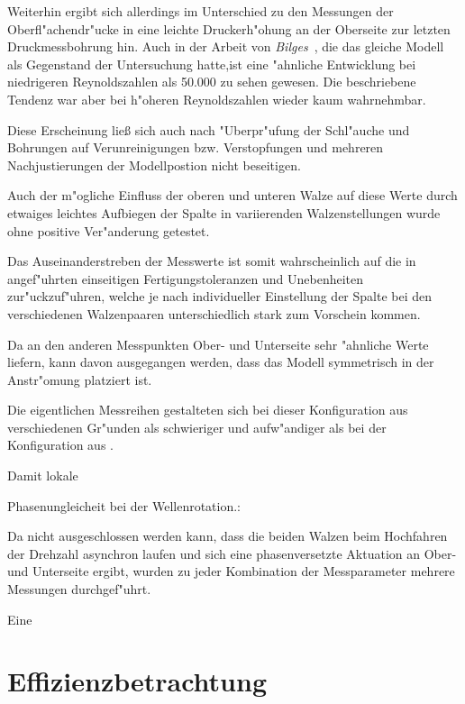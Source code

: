 Weiterhin ergibt sich allerdings im Unterschied zu den Messungen der Oberfl"achendr"ucke in  eine leichte Druckerh"ohung an der Oberseite zur letzten Druckmessbohrung hin.
Auch in der Arbeit von \emph{Bilges} \,\cite{Bilges.2018}, die das gleiche Modell als Gegenstand der Untersuchung hatte,ist eine "ahnliche Entwicklung bei niedrigeren Reynoldszahlen als 50.000 zu sehen gewesen.
Die beschriebene Tendenz war aber bei h"oheren Reynoldszahlen wieder kaum wahrnehmbar.


Diese Erscheinung lie\ss{} sich auch nach "Uberpr"ufung der Schl"auche und Bohrungen auf Verunreinigungen bzw. Verstopfungen und mehreren Nachjustierungen der Modellpostion nicht beseitigen.

Auch der m"ogliche Einfluss der oberen und unteren Walze auf diese Werte durch etwaiges leichtes Aufbiegen der Spalte in variierenden Walzenstellungen wurde ohne positive Ver"anderung getestet.

Das Auseinanderstreben der Messwerte ist somit wahrscheinlich auf die in \cite{Bilges.2018} angef"uhrten einseitigen Fertigungstoleranzen und Unebenheiten zur"uckzuf"uhren, welche je nach individueller Einstellung der Spalte bei den verschiedenen Walzenpaaren unterschiedlich stark zum Vorschein kommen.

Da an den anderen Messpunkten Ober- und Unterseite sehr "ahnliche Werte liefern, kann davon ausgegangen werden, dass das Modell symmetrisch in der Anstr"omung platziert ist.


Die eigentlichen Messreihen gestalteten sich bei dieser Konfiguration aus verschiedenen Gr"unden als schwieriger und aufw"andiger als bei der Konfiguration aus .

Damit lokale

Phasenungleicheit bei der Wellenrotation.:

Da nicht ausgeschlossen werden kann, dass die beiden Walzen beim Hochfahren der Drehzahl asynchron laufen und sich eine phasenversetzte Aktuation an Ober- und Unterseite ergibt, wurden zu jeder Kombination der Messparameter mehrere Messungen durchgef"uhrt.

Eine 
\section{Effizienzbetrachtung}
